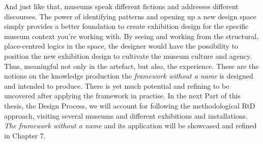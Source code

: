 And just like that, museums speak different fictions and addresses different discourses. The power of identifying patterns and opening up a new design space simply provides a better foundation to create exhibition design for the specific museum context you're working with. By seeing and working from the structural, place-centred logics in the space, the designer would have the possibility to position the new exhibition design to cultivate the museum culture and agency. Thus, meaningful not only in the artefact, but also, the experience. These are the notions on the knowledge production the \emph{framework without a name} is designed and intended to produce. There is yet much potential and refining to be uncovered after applying the framework in practise. In the next Part of this thesis, the Design Process, we will account for following the methodological RtD approach, visiting several museums and different exhibitions and installations. \emph{The framework without a name} and its application will be showcased and refined in Chapter 7. 
